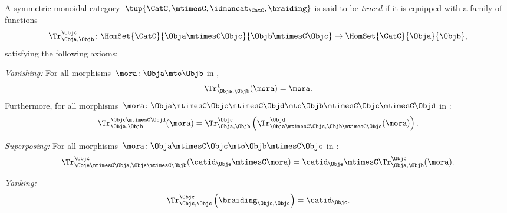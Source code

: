 \begin{ctdefinition}
  \label{def:traced-monoidal-category}
  A symmetric monoidal category~$\tup{\CatC,\mtimesC,\idmoncat_{\CatC}, \braiding}$ is said to be \emph{traced} if it is equipped with a family of functions
  \begin{equation}
    \Tr_{\Obja,\Objb}^\Objc\colon \HomSet{\CatC}{\Obja \mtimesC \Objc}{\Objb\mtimesC \Objc}\to \HomSet{\CatC}{\Obja}{\Objb},
  \end{equation}
  satisfying the following axioms:
  \begin{compactenum}
    \item \emph{Vanishing:} For all morphisms~$\mora \colon \Obja\mto \Objb$ in \CatC,
    \begin{equation}
      \label{eq:vanishing_1}
      \Tr_{\Obja,\Objb}^1(\mora)=\mora.
    \end{equation}
    Furthermore, for all morphisms~$\mora \colon \Obja\mtimesC \Objc \mtimesC \Objd \mto \Objb\mtimesC \Objc \mtimesC \Objd$ in \CatC:
    \begin{equation}
      \label{eq:vanishing_2}
      \Tr_{\Obja,\Objb}^{\Objc\mtimesC \Objd}(\mora)=\Tr_{\Obja,\Objb}^\Objc\left(
      \Tr_{\Obja \mtimesC \Objc , \Objb \mtimesC \Objc}^\Objd(\mora)\right).
    \end{equation}
    \item \emph{Superposing:} For all morphisms~$\mora\colon \Obja\mtimesC \Objc \mto \Objb\mtimesC \Objc$ in \CatC:
    \begin{equation}
      \label{eq:superposing}
      \Tr_{\Obje\mtimesC \Obja,\Obje\mtimesC \Objb}^{\Objc}(\catid_\Obje\mtimesC \mora)=\catid_\Obje\mtimesC \Tr_{\Obja,\Objb}^\Objc(\mora).
    \end{equation}
    \item \emph{Yanking:}
    \begin{equation}
      \label{eq:yanking}
      \Tr_{\Objc,\Objc}^\Objc\left(\braiding_{\Objc,\Objc}\right)=\catid_\Objc.
    \end{equation}
  \end{compactenum}
\end{ctdefinition}
